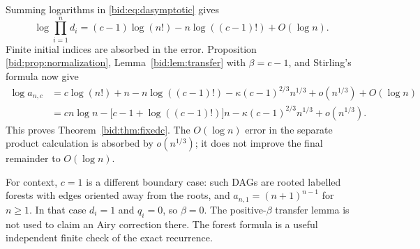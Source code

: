 \documentclass[11pt,letterpaper]{article}
\numberwithin{equation}{section}
\theoremstyle{remark}\newtheorem{remark}[theorem]{Remark}
\begin{document}
Summing logarithms in \eqref{bid:eq:dasymptotic} gives
\begin{equation}\label{bid:eq:productgeneral}
 \log\prod_{i=1}^n d_i
 =(c-1)\log(n!)-n\log((c-1)!)+O(\log n).
\end{equation}
Finite initial indices are absorbed in the error. Proposition
\ref{bid:prop:normalization}, Lemma~\ref{bid:lem:transfer} with $\beta=c-1$,
and Stirling's formula now give
\begin{align*}
 \log a_{n,c}
 &=c\log(n!)+n-n\log((c-1)!)
   -\kappa(c-1)^{2/3}n^{1/3}+o(n^{1/3})+O(\log n)\\
 &=cn\log n-\bigl[c-1+\log((c-1)!)\bigr]n
   -\kappa(c-1)^{2/3}n^{1/3}+o(n^{1/3}).
\end{align*}
This proves Theorem~\ref{bid:thm:fixedc}. The $O(\log n)$ error in the
separate product calculation is absorbed by $o(n^{1/3})$; it does not
improve the final remainder to $O(\log n)$.

For context, $c=1$ is a different boundary case: such DAGs are rooted
labelled forests with edges oriented away from the roots, and
$a_{n,1}=(n+1)^{n-1}$ for $n\geq1$. In that case $d_i=1$ and $q_i=0$,
so $\beta=0$. The positive-$\beta$ transfer lemma is not used to claim
an Airy correction there. The forest formula is a useful independent
finite check of the exact recurrence.
\end{document}
